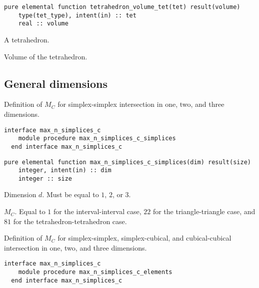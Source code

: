 \documentclass{article}
\begin{document}
\begin{lstlisting}[language=FORTRAN]
  pure elemental function tetrahedron_volume_tet(tet) result(volume)
    type(tet_type), intent(in) :: tet
    real :: volume
\end{lstlisting}

\begin{description}[font=\ttfamily\bfseries,leftmargin=2.2\parindent,labelindent=1.7\parindent,noitemsep]
  \item[tet] A tetrahedron.
  \item[volume] Volume of the tetrahedron.
\end{description}

\subsection{General dimensions}\label{sect:nD_intersection}

Definition of $M_C$ for simplex-simplex intersection in one, two, and three
dimensions.

\begin{lstlisting}[language=FORTRAN]
  interface max_n_simplices_c
    module procedure max_n_simplices_c_simplices
  end interface max_n_simplices_c
\end{lstlisting}

\begin{lstlisting}[language=FORTRAN]
  pure elemental function max_n_simplices_c_simplices(dim) result(size)
    integer, intent(in) :: dim
    integer :: size
\end{lstlisting}

\begin{description}[font=\ttfamily\bfseries,leftmargin=2.2\parindent,labelindent=1.7\parindent,noitemsep]
  \item[dim] Dimension $d$. Must be equal to $1$, $2$, or $3$.
  \item[size] $M_C$. Equal to $1$ for the interval-interval case, $22$ for the
    triangle-triangle case, and $81$ for the tetrahedron-tetrahedron case.
\end{description}

\noindent Definition of $M_C$ for simplex-simplex, simplex-cubical, and
cubical-cubical intersection in one, two, and three dimensions.
  
\begin{lstlisting}[language=FORTRAN]
  interface max_n_simplices_c
    module procedure max_n_simplices_c_elements
  end interface max_n_simplices_c
\end{lstlisting}
\end{document}

